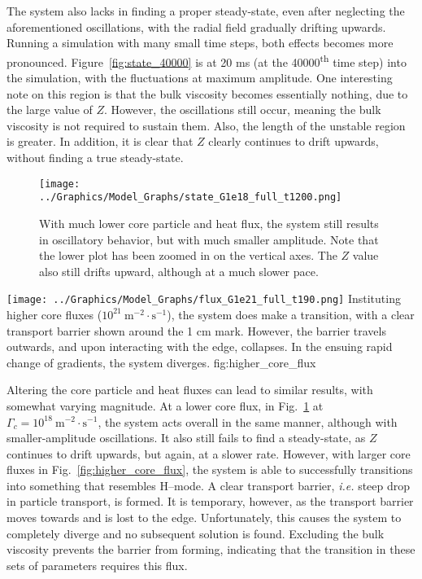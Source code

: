 The system also lacks in finding a proper steady-state, even after neglecting the aforementioned oscillations, with the radial field gradually drifting upwards.
Running a simulation with many small time steps, both effects becomes more pronounced.
Figure~\ref{fig:state_40000} is at 20 ms (at the 40000\textsuperscript{th} time step) into the simulation, with the fluctuations at maximum amplitude.
One interesting note on this region is that the bulk viscosity becomes essentially nothing, due to the large value of $Z$.
However, the oscillations still occur, meaning the bulk viscosity is not required to sustain them.
Also, the length of the unstable region is greater.
In addition, it is clear that $Z$ clearly continues to drift upwards, without finding a true steady-state.
\begin{figure}[hbt] %
\begin{minipage}{0.49\linewidth}
	\centering
	\texttt{[image: ../Graphics/Model\_Graphs/state\_G1e18\_full\_t1200.png]}
\end{minipage}
\hfill
\begin{minipage}{0.49\linewidth}
	\caption{With much lower core particle and heat flux, the system still results in oscillatory behavior, but with much smaller amplitude.
	Note that the lower plot has been zoomed in on the vertical axes.
	The $Z$ value also still drifts upward, although at a much slower pace.}
	\label{fig:lower_core_flux}
\end{minipage}
\end{figure}

	{\texttt{[image: ../Graphics/Model\_Graphs/flux\_G1e21\_full\_t190.png]}}
	{Instituting higher core fluxes ($10^{21}~\text{m}^{-2}\cdot\text{s}^{-1}$), the system does make a transition, with a clear transport barrier shown around the 1 cm mark.
	However, the barrier travels outwards, and upon interacting with the edge, collapses.
	In the ensuing rapid change of gradients, the system diverges.}
	{fig:higher_core_flux}

Altering the core particle and heat fluxes can lead to similar results, with somewhat varying magnitude.
At a lower core flux, in Fig.~\ref{fig:lower_core_flux} at $\Gamma_c = 10^{18}~\text{m}^{-2}\cdot\text{s}^{-1}$, the system acts overall in the same manner, although with smaller-amplitude oscillations.
It also still fails to find a steady-state, as $Z$ continues to drift upwards, but again, at a slower rate.
However, with larger core fluxes in Fig.~\ref{fig:higher_core_flux}, the system is able to successfully transitions into something that resembles H--mode.
A clear transport barrier, \emph{i.e.} steep drop in particle transport, is formed.
It is temporary, however, as the transport barrier moves towards and is lost to the edge.
Unfortunately, this causes the system to completely diverge and no subsequent solution is found.
Excluding the bulk viscosity prevents the barrier from forming, indicating that the transition in these sets of parameters requires this flux.

